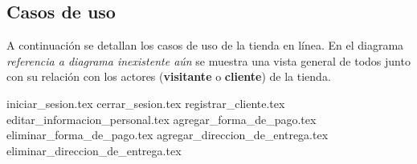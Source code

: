 %
%

\subsection{Casos de uso}

A continuación se detallan los casos de uso de la tienda en línea. En el
diagrama \textit{referencia a diagrama inexistente aún} se muestra una vista
general de todos junto con su relación con los actores (\textbf{visitante} o
\textbf{cliente}) de la tienda.


{iniciar_sesion.tex}
{cerrar_sesion.tex}
{registrar_cliente.tex}
{editar_informacion_personal.tex}
{agregar_forma_de_pago.tex}
{eliminar_forma_de_pago.tex}
{agregar_direccion_de_entrega.tex}
{eliminar_direccion_de_entrega.tex}
